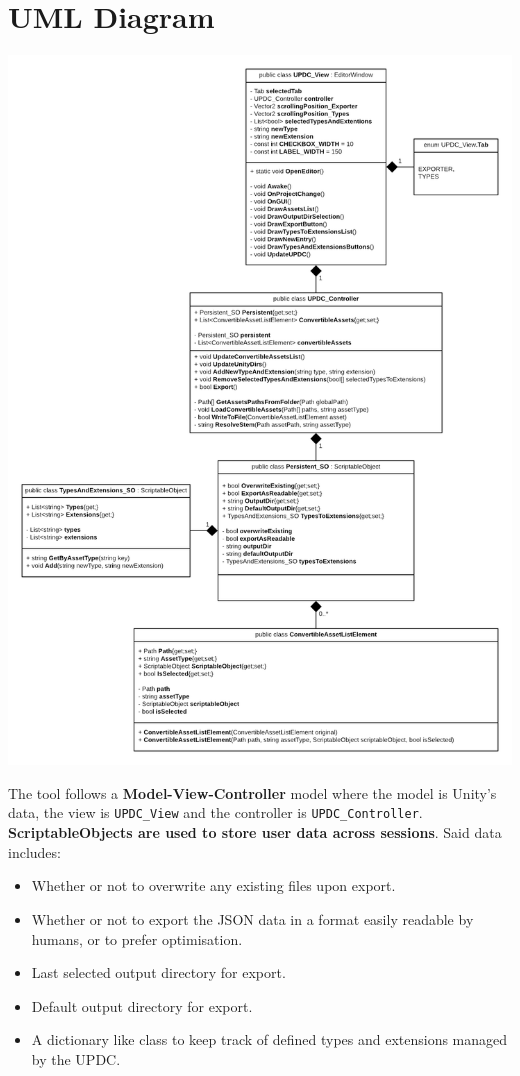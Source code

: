 \documentclass[12pt,a4paper]{article}
\begin{document}
\section{UML Diagram}
\begin{center}
\includegraphics[scale=0.35]{UPDCUML}
\end{center}
\newpage
\noindent The tool follows a \textbf{Model-View-Controller} model where the model is Unity's data, the view is \texttt{UPDC\_View} and the controller is \texttt{UPDC\_Controller}.\\
\textbf{ScriptableObjects are used to store user data across sessions}. Said data includes:
\begin{itemize}
\item Whether or not to overwrite any existing files upon export.
\item Whether or not to export the JSON data in a format easily readable by humans, or to prefer optimisation.
\item Last selected output directory for export.
\item Default output directory for export.
\item A dictionary like class to keep track of defined types and extensions managed by the UPDC.
\end{itemize}
\end{document}
